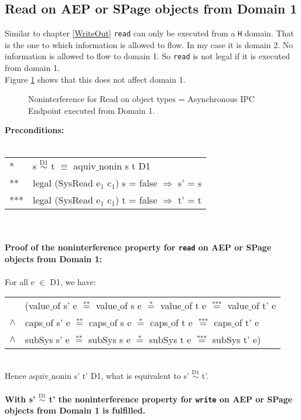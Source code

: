 \subsection{Read on AEP or SPage objects from Domain 1}
Similar to chapter \ref{WriteOut} \texttt{read} can only be executed from a \texttt{H} domain. That is the one to which information is allowed to flow. In my case it is domain 2. No information is allowed to flow to domain 1. So \texttt{read} is not legal if it is executed from domain 1.\\
Figure \ref{fig:ReadOut} shows that this does not affect domain 1. 
\begin{figure}[H]
\caption{Noninterference for Read on object types = Asynchronous IPC Endpoint executed from Domain 1.}
\label{fig:ReadOut}
\end{figure} 
\textbf{Preconditions:} \\ \\
\begin{tabular}{ll}
* & s $\overset{\text{D1}}{\sim}$ t $\equiv$ aquiv$\_$nonin s t D1	\\ 
** & legal (SysRead e$_1$ c$_1$) s = false $\Rightarrow$ s' = s \\ 
*** & legal (SysRead e$_1$ c$_1$) t = false $\Rightarrow$ t' = t
\end{tabular} \\ \\ 
\textbf{Proof of the noninterference property for \texttt{read} on AEP or SPage objects from Domain 1:}\\ \\
For all e $\in$ D1, we have: \\ 
\begin{tabular}{ll}
& (value$\_$of s' e $\overset{\text{**}}{=}$ value$\_$of s e $\overset{\text{*}}{=}$ value$\_$of t e $\overset{\text{***}}{=}$ value$\_$of t' e \\
$\wedge$ & caps$\_$of s' e $\overset{\text{**}}{=}$ caps$\_$of s e $\overset{\text{*}}{=}$ caps$\_$of t e $\overset{\text{***}}{=}$ caps$\_$of t' e \\
$\wedge$ & subSys s' e $\overset{\text{**}}{=}$ subSys s e $\overset{\text{*}}{=}$ subSys t e $\overset{\text{***}}{=}$ subSys t' e)
\end{tabular} \\
Hence aquiv$\_$nonin s' t' D1, what is equivalent to s' $\overset{\text{D1}}{\sim}$ t'.\\ \\ 
\textbf{With s' $\overset{\text{D1}}{\sim}$ t' the noninterference property for \texttt{write} on AEP or SPage objects from Domain 1 is fulfilled.}  
\clearpage
